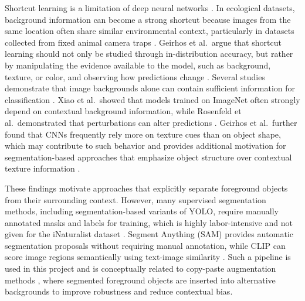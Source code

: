 \documentclass[sigconf, nonacm]{acmart}
\begin{document}
Shortcut learning is a limitation of deep neural networks \cite{geirhos2020shortcut}. In ecological datasets, 
background information can become a strong shortcut because images from the same location often share similar environmental context, particularly in datasets collected from fixed animal camera traps \cite{Beery_2018_RecogTerra}. Geirhos et al.\ argue that shortcut learning should not only be studied through in-distribution accuracy, but rather by manipulating the evidence available to the model, such as background, texture, or color, and observing how predictions change \cite{geirhos2020shortcut}. Several studies demonstrate that image backgrounds alone can contain sufficient information for classification \cite{xiao2021noise, obj_recog_without_background}. Xiao et al.\ showed that models trained on ImageNet often strongly depend on contextual background information, while Rosenfeld et al.\ demonstrated that perturbations can alter predictions \cite{xiao2021noise, rosenfeld2018elephantroom}. Geirhos et al.\ further found that CNNs frequently rely more on texture cues than on object shape, which may contribute to such behavior and provides additional motivation for segmentation-based approaches that emphasize object structure over contextual texture information \cite{geirhos2018TextureFeats}.

These findings motivate approaches that explicitly separate foreground objects from their surrounding context. However, many supervised segmentation methods, including segmentation-based variants of YOLO, require manually annotated masks and labels for training, which is highly labor-intensive and not given for the iNaturalist dataset \cite{YOLO}. %
Segment Anything (SAM) \cite{sam_1, sam_2} provides automatic segmentation proposals  without requiring manual annotation, while CLIP can score image regions semantically using text-image similarity \cite{CLIP}. 
Such a pipeline is used in this project and is conceptually related to copy-paste augmentation methods \cite{copy_paste_augmentation}, where segmented foreground objects are inserted into alternative backgrounds to improve robustness and reduce contextual bias.
\end{document}
